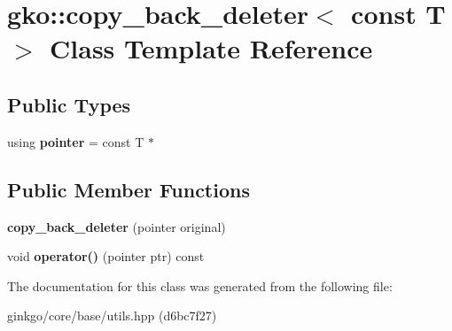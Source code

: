 \hypertarget{classgko_1_1copy__back__deleter_3_01const_01T_01_4}{}\section{gko\+:\+:copy\+\_\+back\+\_\+deleter$<$ const T $>$ Class Template Reference}
\label{classgko_1_1copy__back__deleter_3_01const_01T_01_4}
\subsection*{Public Types}
\begin{DoxyCompactItemize}
\item 
\mbox{\label{classgko_1_1copy__back__deleter_3_01const_01T_01_4_ac97aced5ec2b913d1b2ed864852c7e7a}} 
using {\bfseries pointer} = const T $\ast$
\end{DoxyCompactItemize}
\subsection*{Public Member Functions}
\begin{DoxyCompactItemize}
\item 
\mbox{\label{classgko_1_1copy__back__deleter_3_01const_01T_01_4_a5df23aa81eb300213916238b9bf93507}} 
{\bfseries copy\+\_\+back\+\_\+deleter} (pointer original)
\item 
\mbox{\label{classgko_1_1copy__back__deleter_3_01const_01T_01_4_a040c2d22121f60c491e3b6e65f399248}} 
void {\bfseries operator()} (pointer ptr) const
\end{DoxyCompactItemize}


The documentation for this class was generated from the following file\+:\begin{DoxyCompactItemize}
\item 
ginkgo/core/base/utils.\+hpp (d6bc7f27)\end{DoxyCompactItemize}
